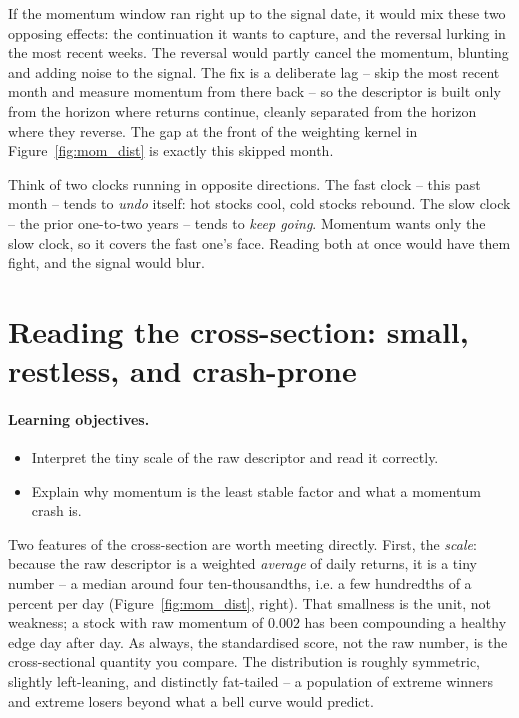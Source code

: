 \documentclass[11pt]{article}
\theoremstyle{definition}
\theoremstyle{plain}
\theoremstyle{remark}
\begin{document}
If the momentum window ran right up to the signal date, it would mix these two opposing effects: the continuation it wants to capture, and the reversal lurking in the most recent weeks. The reversal would partly cancel the momentum, blunting and adding noise to the signal. The fix is a deliberate lag -- skip the most recent month and measure momentum from there back -- so the descriptor is built only from the horizon where returns continue, cleanly separated from the horizon where they reverse. The gap at the front of the weighting kernel in Figure~\ref{fig:mom_dist} is exactly this skipped month.

\begin{intuition}
Think of two clocks running in opposite directions. The fast clock -- this past month -- tends to \emph{undo} itself: hot stocks cool, cold stocks rebound. The slow clock -- the prior one-to-two years -- tends to \emph{keep going}. Momentum wants only the slow clock, so it covers the fast one's face. Reading both at once would have them fight, and the signal would blur.
\end{intuition}

\section{Reading the cross-section: small, restless, and crash-prone}\label{sec:reading}

\paragraph{Learning objectives.}
\begin{itemize}[leftmargin=1.4em,topsep=2pt]
  \item Interpret the tiny scale of the raw descriptor and read it correctly.
  \item Explain why momentum is the least stable factor and what a momentum crash is.
\end{itemize}

Two features of the cross-section are worth meeting directly. First, the \emph{scale}: because the raw descriptor is a weighted \emph{average} of daily returns, it is a tiny number -- a median around four ten-thousandths, i.e. a few hundredths of a percent per day (Figure~\ref{fig:mom_dist}, right). That smallness is the unit, not weakness; a stock with raw momentum of $0.002$ has been compounding a healthy edge day after day. As always, the standardised score, not the raw number, is the cross-sectional quantity you compare. The distribution is roughly symmetric, slightly left-leaning, and distinctly fat-tailed -- a population of extreme winners and extreme losers beyond what a bell curve would predict.
\end{document}
